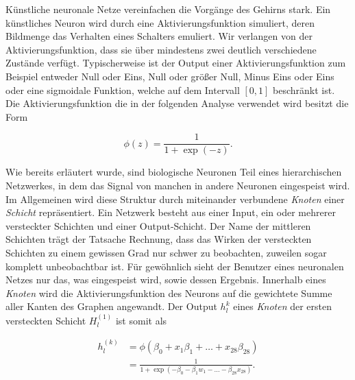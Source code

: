 \documentclass{article}
\begin{document}
K{\"u}nstliche neuronale Netze vereinfachen die Vorg{\"a}nge des Gehirns stark. Ein k{\"u}nstliches Neuron wird durch eine Aktivierungsfunktion simuliert, deren Bildmenge das Verhalten eines Schalters emuliert. Wir verlangen von der Aktivierungsfunktion, dass sie {\"u}ber mindestens zwei deutlich verschiedene Zust{\"a}nde verf{\"u}gt. Typischerweise ist der Output einer Aktivierungsfunktion zum Beispiel entweder Null oder Eins, Null oder gr{\"o}{\ss}er Null, Minus Eins oder Eins oder eine sigmoidale Funktion, welche auf dem Intervall $ \left[0, 1\right] $ beschr{\"a}nkt ist. Die Aktivierungsfunktion die in der folgenden Analyse verwendet wird besitzt die Form

\begin{equation}
\label{sigmoid}
\phi (z) = \frac{1}{1 + \exp (-z)}.
\end{equation}

Wie bereits erl{\"a}utert wurde, sind biologische Neuronen Teil eines hierarchischen Netzwerkes, in dem das Signal von manchen in andere Neuronen eingespeist wird. Im Allgemeinen wird diese Struktur durch miteinander verbundene \textit{Knoten} einer \textit{Schicht} repr{\"a}sentiert. Ein Netzwerk besteht aus einer Input, ein oder mehrerer versteckter Schichten und einer Output-Schicht. Der Name der mittleren Schichten tr{\"a}gt der Tatsache Rechnung, dass das Wirken der versteckten Schichten zu einem gewissen Grad nur schwer zu beobachten, zuweilen sogar komplett unbeobachtbar ist. F{\"u}r gew{\"o}hnlich sieht der Benutzer eines neuronalen Netzes nur das, was eingespeist wird, sowie dessen Ergebnis. Innerhalb eines \textit{Knoten} wird die Aktivierungsfunktion des Neurons auf die gewichtete Summe aller Kanten des Graphen angewandt. Der Output $h^{k}_l$ eines \textit{Knoten} der ersten versteckten Schicht $H^{(1)}_l$ ist somit als

\begin{equation}
\label{nodeOut}
\begin{split}
h^{(k)}_l &= \phi(\beta_0 + x_1 \beta_1 + \dots + x_{28} \beta_{28}) \\
        &= \frac{1}{1 + \exp (-\beta_0 - \beta_1 w_1 - \dots - \beta_{28}x_{28})}.
\end{split}
\end{equation}


\end{document}
